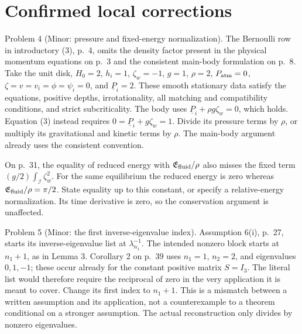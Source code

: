 \documentclass[10pt]{article}
\begin{document}
\section*{Confirmed local corrections}
Problem 4 (Minor: pressure and fixed-energy normalization).  The Bernoulli row in introductory (3), p. 4, omits the density factor present in the physical momentum equations on p. 3 and the consistent main-body formulation on p. 8. Take the unit disk, \(H_0=2\), \(h_i=1\), \(\zeta_w=-1\), \(g=1\), \(\rho=2\), \(P_{\rm atm}=0\), \(\zeta=v=v_i=\phi=\psi_i=0\), and \(\underline P_i=2\). These smooth stationary data satisfy the equations, positive depths, irrotationality, all matching and compatibility conditions, and strict subcriticality. The body uses \(\underline P_i+\rho g\zeta_w=0\), which holds. Equation (3) instead requires \(0=\underline P_i+g\zeta_w=1\). Divide its pressure terms by \(\rho\), or multiply its gravitational and kinetic terms by \(\rho\). The main-body argument already uses the consistent convention.\par
On p. 31, the equality of reduced energy with \(\mathfrak E_{\rm fluid}/\rho\) also misses the fixed term \((g/2)\int_\mathcal I\zeta_w^2\). For the same equilibrium the reduced energy is zero whereas \(\mathfrak E_{\rm fluid}/\rho=\pi/2\). State equality up to this constant, or specify a relative-energy normalization. Its time derivative is zero, so the conservation argument is unaffected.\par
Problem 5 (Minor: the first inverse-eigenvalue index).  Assumption 6(i), p. 27, starts its inverse-eigenvalue list at \(\lambda_{n_1}^{-1}\). The intended nonzero block starts at \(n_1+1\), as in Lemma 3. Corollary 2 on p. 39 uses \(n_1=1\), \(n_2=2\), and eigenvalues \(0,1,-1\); these occur already for the constant positive matrix \(S=I_3\). The literal list would therefore require the reciprocal of zero in the very application it is meant to cover. Change its first index to \(n_1+1\). This is a mismatch between a written assumption and its application, not a counterexample to a theorem conditional on a stronger assumption. The actual reconstruction only divides by nonzero eigenvalues.\par
\end{document}

